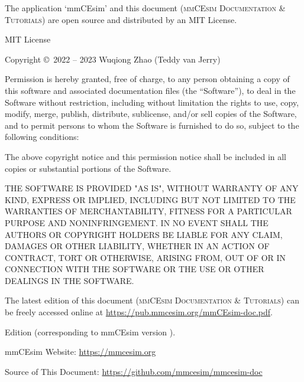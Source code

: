 \vspace*{-\fill}

\noindent
The application `mmCEsim' and this document
(\textsc{mmCEsim Documentation \& Tutorials})
are open source and distributed by an MIT License.
\newline

\noindent
MIT License
\newline

\noindent
Copyright \copyright~2022 -- 2023 Wuqiong Zhao (Teddy van Jerry)
\newline

\noindent
Permission is hereby granted, free of charge, to any person obtaining a copy
of this software and associated documentation files (the ``Software''), to deal
in the Software without restriction, including without limitation the rights
to use, copy, modify, merge, publish, distribute, sublicense, and/or sell
copies of the Software, and to permit persons to whom the Software is
furnished to do so, subject to the following conditions:
\newline

\noindent
The above copyright notice and this permission notice shall be included in all
copies or substantial portions of the Software.
\newline

\noindent
THE SOFTWARE IS PROVIDED "AS IS", WITHOUT WARRANTY OF ANY KIND, EXPRESS OR
IMPLIED, INCLUDING BUT NOT LIMITED TO THE WARRANTIES OF MERCHANTABILITY,
FITNESS FOR A PARTICULAR PURPOSE AND NONINFRINGEMENT. IN NO EVENT SHALL THE
AUTHORS OR COPYRIGHT HOLDERS BE LIABLE FOR ANY CLAIM, DAMAGES OR OTHER
LIABILITY, WHETHER IN AN ACTION OF CONTRACT, TORT OR OTHERWISE, ARISING FROM,
OUT OF OR IN CONNECTION WITH THE SOFTWARE OR THE USE OR OTHER DEALINGS IN THE
SOFTWARE.
\newline
\newline

\noindent
The latest edition of this document (\textsc{mmCEsim Documentation \& Tutorials})
can be freely accessed online at \url{https://pub.mmcesim.org/mmCEsim-doc.pdf}.
\newline

\noindent
Edition \mmCEsimDate{}
(corresponding to mmCEsim version \mmCEsimVersion).

\vfill
\noindent
mmCEsim Website: \url{https://mmcesim.org}

\noindent
Source of This Document: \url{https://github.com/mmcesim/mmcesim-doc}
